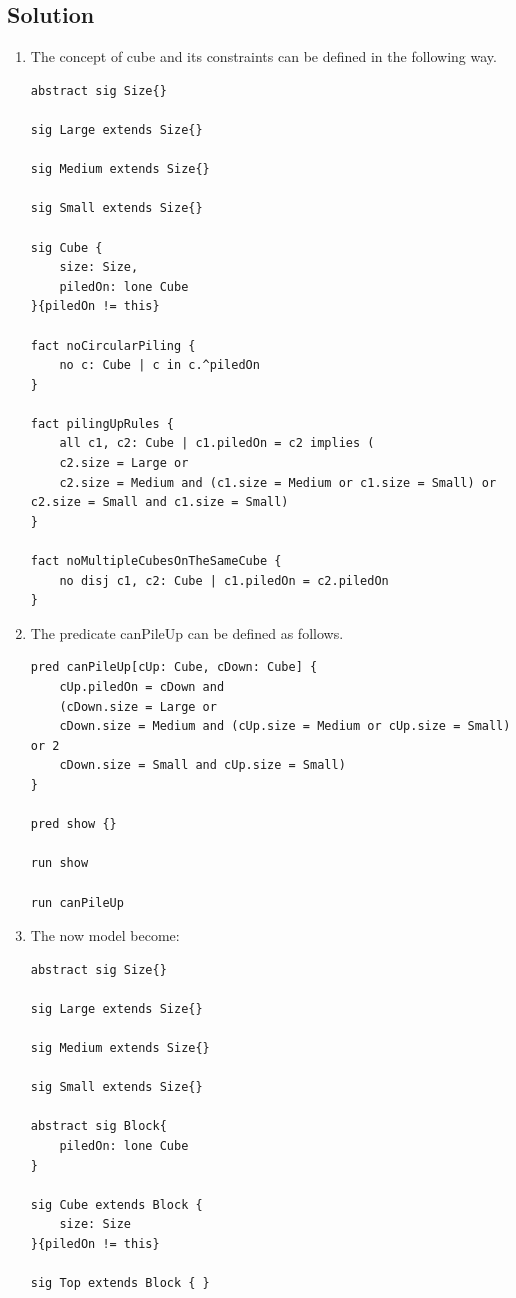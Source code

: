 \documentclass[12pt, a4paper]{report}
\begin{document}
    \subsection*{Solution}
    \begin{enumerate}
        \item The concept of cube and its constraints can be defined in the following way. 
            \begin{lstlisting}[language=alloy]
abstract sig Size{}

sig Large extends Size{} 

sig Medium extends Size{} 

sig Small extends Size{}

sig Cube {
    size: Size,
    piledOn: lone Cube
}{piledOn != this}

fact noCircularPiling {
    no c: Cube | c in c.^piledOn
}

fact pilingUpRules {
    all c1, c2: Cube | c1.piledOn = c2 implies (
    c2.size = Large or
    c2.size = Medium and (c1.size = Medium or c1.size = Small) or c2.size = Small and c1.size = Small)
}

fact noMultipleCubesOnTheSameCube {
    no disj c1, c2: Cube | c1.piledOn = c2.piledOn
}
            \end{lstlisting}
        \item The predicate canPileUp can be defined as follows. 
            \begin{lstlisting}[language=alloy]
pred canPileUp[cUp: Cube, cDown: Cube] {
    cUp.piledOn = cDown and
    (cDown.size = Large or
    cDown.size = Medium and (cUp.size = Medium or cUp.size = Small) or 2
    cDown.size = Small and cUp.size = Small) 
}

pred show {} 

run show

run canPileUp
            \end{lstlisting}
        \item The now model become: 
            \begin{lstlisting}[language=alloy]
abstract sig Size{}

sig Large extends Size{} 

sig Medium extends Size{} 

sig Small extends Size{}

abstract sig Block{ 
    piledOn: lone Cube
}

sig Cube extends Block { 
    size: Size
}{piledOn != this}

sig Top extends Block { }


\end{lstlisting}
\end{enumerate}
\end{document}
